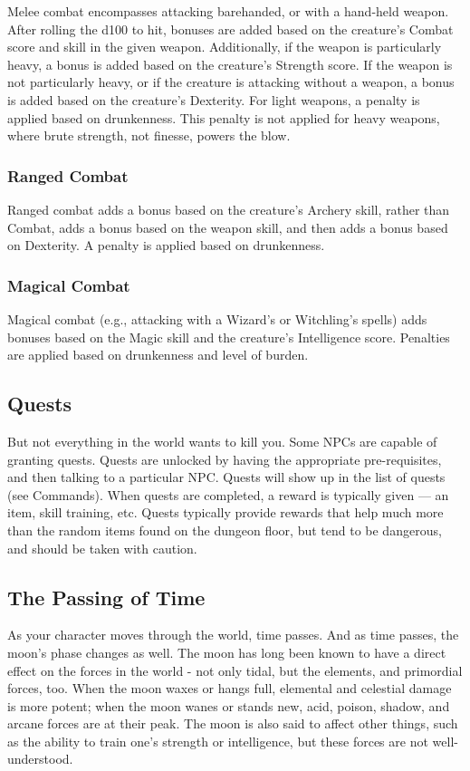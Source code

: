 Melee combat encompasses attacking barehanded, or with a hand-held
weapon.  After rolling the d100 to hit, bonuses are added based on the
creature's Combat score and skill in the given weapon.  Additionally, if
the weapon is particularly heavy, a bonus is added based on the creature's
Strength score.  If the weapon is not particularly heavy, or if the
creature is attacking without a weapon, a bonus is added based on the 
creature's Dexterity.  For light weapons, a penalty is applied based on
drunkenness.  This penalty is not applied for heavy weapons, where brute
strength, not finesse, powers the blow.

\subsubsection{Ranged Combat}

Ranged combat adds a bonus based on the creature's Archery skill, rather
than Combat, adds a bonus based on the weapon skill, and then adds a 
bonus based on Dexterity.  A penalty is applied based on drunkenness.

\subsubsection{Magical Combat}

Magical combat (e.g., attacking with a Wizard's or Witchling's spells)
adds bonuses based on the Magic skill and the creature's Intelligence
score.  Penalties are applied based on drunkenness and level of burden.

\subsection{Quests}

But not everything in the world wants to kill you.  Some NPCs are capable 
of granting quests.  Quests are unlocked by having the appropriate 
pre-requisites, and then talking to a particular NPC.  Quests will show up 
in the list of quests (see Commands).  When quests are completed, a reward 
is typically given --- an item, skill training, etc.  Quests typically 
provide rewards that help much more than the random items found on the 
dungeon floor, but tend to be dangerous, and should be taken with caution.

\subsection{The Passing of Time}

As your character moves through the world, time passes.  And as time
passes, the moon's phase changes as well.  The moon has long been known to
have a direct effect on the forces in the world - not only tidal, but the
elements, and primordial forces, too.  When the moon waxes or hangs full, 
elemental and celestial damage is more potent; when the moon wanes or
stands new, acid, poison, shadow, and arcane forces are at their peak.
The moon is also said to affect other things, such as the ability to train
one's strength or intelligence, but these forces are not well-understood.

